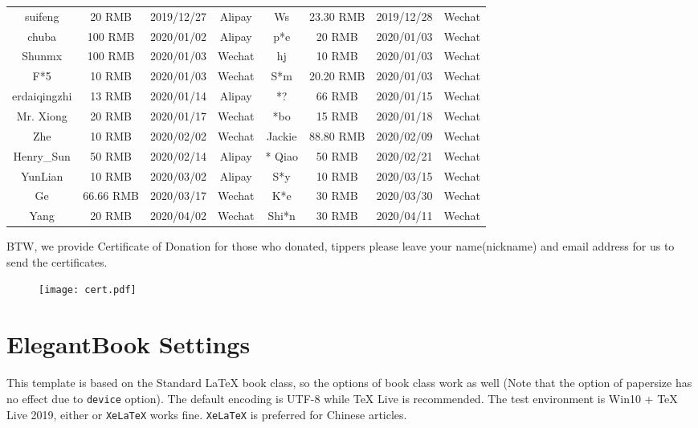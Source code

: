 \documentclass[11pt,fancy,authoryear]{elegantbook}
\begin{document}
\begin{table}[!htb]
\begin{tabular}{*{4}{>{\scriptsize}c}|*{4}{>{\scriptsize}c}}
    suifeng   & 20 RMB & 2019/12/27 & Alipay   & Ws    & 23.30 RMB & 2019/12/28 & Wechat \\
    chuba    & 100 RMB  & 2020/01/02 & Alipay   & p*e   & 20 RMB & 2020/01/03 & Wechat \\
    Shunmx & 100 RMB & 2020/01/03 & Wechat    & hj    & 10 RMB & 2020/01/03 & Wechat \\
    F*5   & 10 RMB & 2020/01/03 & Wechat    & S*m   & 20.20 RMB & 2020/01/03 & Wechat \\
    erdaiqingzhi  & 13 RMB & 2020/01/14 & Alipay   & *?    & 66 RMB & 2020/01/15 & Wechat \\
    Mr. Xiong & 20 RMB & 2020/01/17 & Wechat    & *bo    & 15 RMB & 2020/01/18 & Wechat \\
    *Zhe    & 10 RMB & 2020/02/02 & Wechat    &  Jackie &  88.80 RMB  &  2020/02/09 & Wechat \\
    Henry\_Sun & 50 RMB & 2020/02/14 & Alipay & * Qiao  & 50 RMB & 2020/02/21 & Wechat \\
    YunLian & 10 RMB & 2020/03/02 & Alipay & S*y  &  10 RMB  &  2020/03/15 & Wechat \\
    * Ge  & 66.66 RMB & 2020/03/17 & Wechat    &   K*e & 30 RMB & 2020/03/30 & Wechat\\
    * Yang  &  20 RMB  &  2020/04/02 & Wechat & Shi*n  & 30 RMB & 2020/04/11 & Wechat \\
    \bottomrule
  \end{tabular}%
  \label{tab:donation}%
\end{table}%

BTW, we provide Certificate of Donation for those who donated, tippers please leave your name(nickname) and email address for us to send the certificates.

\begin{figure}[!htb]
  \centering
  \texttt{[image: cert.pdf]}
\end{figure}

\chapter{ElegantBook Settings}

This template is based on the Standard \LaTeX{} book class, so the options of book class work as well (Note that the option of papersize has no effect due to \lstinline{device} option). The default encoding is UTF-8 while \TeX{} Live is recommended. The test environment is Win10 + \TeX{} Live 2019, either  or \lstinline{XeLaTeX} works fine. \lstinline{XeLaTeX} is preferred for Chinese articles.
\end{document}
